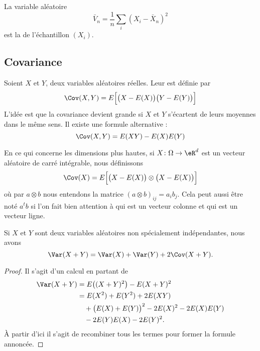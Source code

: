 La variable aléatoire 
\begin{equation}
    \bar V_n=\frac{1}{ n }\sum_i(X_i-\bar X_n)^2
\end{equation}
est la  de l'échantillon \( (X_i)\).

\subsection{Covariance}

Soient \( X\) et \( Y\), deux variables aléatoires réelles. Leur  est définie par
\begin{equation}
    \Cov(X,Y)=E\Big[ \big( X-E(X) \big)\big( Y-E(Y) \big) \Big]
\end{equation}
L'idée est que la covariance devient grande si \( X\) et \( Y\) s'écartent de leurs moyennes dans le même sens. Il existe une formule alternative :
\begin{equation}
    \Cov(X,Y)=E(XY)-E(X)E(Y)
\end{equation}

En ce qui concerne les dimensions plus hautes, si \( X\colon \Omega\to \eR^d\) est un vecteur aléatoire de carré intégrable, nous définissons
\begin{equation}    \label{EqZlvLWx}
    \Cov(X)=E\Big[ \big(  X-E(X) \big)\otimes\big( X-E(X)\big) \Big]
\end{equation}
où par \( a\otimes b\) nous entendons la matrice \( (a\otimes b)_{ij}=a_ib_j\). Cela peut aussi être noté \( a^tb\) si l'on fait bien attention à qui est un vecteur colonne et qui est un vecteur ligne.

\begin{proposition}     \label{PropoVarXpYCov}
    Si \( X\) et \( Y\) sont deux variables aléatoires non spécialement indépendantes, nous avons
    \begin{equation}
        \Var(X+Y)=\Var(X)+\Var(Y)+2\Cov(X+Y).
    \end{equation}
\end{proposition}

\begin{proof}
    Il s'agit d'un calcul en partant de
    \begin{equation}
        \begin{aligned}[]
            \Var(X+Y)&=E\big( (X+Y)^2 \big)-E(X+Y)^2\\
            &=E(X^2)+E(Y^2)+2E(XY)\\
            &\quad+\big( E(X)+E(Y) \big)^2-2E(X)^2-2E(X)E(Y)\\
            &\quad-2 E(Y)E(X)-2E(Y)^2.
        \end{aligned}
    \end{equation}
    À partir d'ici il s'agit de recombiner tous les termes pour former la formule annoncée.
\end{proof}

